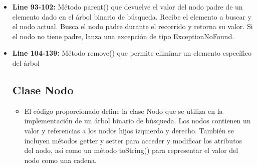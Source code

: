 \documentclass{article}
\begin{document}
\begin{itemize}
		\item \textbf{Line 93-102:} Método parent() que devuelve el valor del nodo padre de un elemento dado en el árbol binario de búsqueda. Recibe el elemento a buscar y el nodo actual. Busca el nodo padre durante el recorrido y retorna su valor. Si el nodo no tiene padre, lanza una excepción de tipo ExceptionNoFound.
		\item \textbf{Line 104-139:} Método remove() que permite eliminar un elemento específico del árbol

	\subsection{Clase Nodo}
	\begin{itemize}	
		\item  El código proporcionado define la clase Nodo que se utiliza en la implementación de un árbol binario de búsqueda. Los nodos contienen un valor y referencias a los nodos hijos izquierdo y derecho. También se incluyen métodos getter y setter para acceder y modificar los atributos del nodo, así como un método toString() para representar el valor del nodo como una cadena.

	\end{itemize}	
	
		


\end{itemize}
\end{document}
